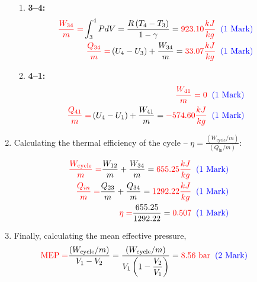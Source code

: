 \documentclass[12pt,twoside]{report}
\newcommand{\frc}{\displaystyle\frac}
\begin{document}
\begin{description}
\begin{enumerate}
\begin{enumerate}
%
\item {\bf 3--4:}
\begin{eqnarray}
&& \textcolor{red}{\frc{W_{34}}{m}=}\int_{3}^{4}P dV = \frc{R\left(T_{4}-T_{3}\right)}{1-\gamma} = \textcolor{red}{923.10 \frc{kJ}{kg}}\;\;\textcolor{blue}{\text{(1 Mark)}} \nonumber \\
&& \textcolor{red}{\frc{Q_{34}}{m}=}\left(U_{4}-U_{3}\right)+\frc{W_{34}}{m}=\textcolor{red}{33.07\frc{kJ}{kg}}\;\;\textcolor{blue}{\text{(1 Mark)}} \nonumber 
\end{eqnarray}

% 
\item {\bf 4--1:}
\begin{eqnarray}
&& \textcolor{red}{\frc{W_{41}}{m}=0} \;\;\textcolor{blue}{\text{(1 Mark)}} \nonumber \\
&& \textcolor{red}{\frc{Q_{41}}{m}=}\left(U_{4}-U_{1}\right)+\frc{W_{41}}{m}=\textcolor{red}{-574.60\frc{kJ}{kg}}\;\;\textcolor{blue}{\text{(1 Mark)}} \nonumber 
\end{eqnarray} 

\end{enumerate}

\item Calculating the thermal efficiency of the cycle -- $\eta = \frc{\left(W_{\text{cycle}}/m\right)}{\left(Q_{\text{in}}/m\right)}$:

\begin{eqnarray}
&& \textcolor{red}{\frc{W_{\text{cycle}}}{m} =} \frc{W_{12}}{m} + \frc{W_{34}}{m} = \textcolor{red}{655.25\frc{kJ}{kg}}\;\;\textcolor{blue}{\text{(1 Mark)}} \nonumber \\ 
&& \textcolor{red}{\frc{Q_{in}}{m} =} \frc{Q_{23}}{m} + \frc{Q_{34}}{m} = \textcolor{red}{1292.22\frc{kJ}{kg}}\;\;\textcolor{blue}{\text{(1 Mark)}} \nonumber \\
&& \textcolor{red}{\eta =} \frc{655.25}{1292.22}=\textcolor{red}{0.507}\;\;\textcolor{blue}{\text{(1 Mark)}} \nonumber 
\end{eqnarray}

\item Finally, calculating the mean effective pressure,
\begin{displaymath}
\textcolor{red}{\text{MEP} =} \frc{\left(W_{\text{cycle}}/m\right)}{V_{1}-V_{2}}=\frc{\left(W_{\text{cycle}}/m\right)}{V_{1}\left(1 - \frc{V_{2}}{V_{1}}\right)} = \textcolor{red}{8.56\text{ bar}}\;\;\textcolor{blue}{\text{(2 Mark)}}
\end{displaymath}

\end{enumerate}



\end{description}
\end{document}
